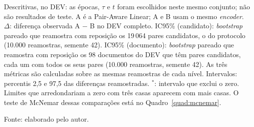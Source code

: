 \vspace{-\baselineskip}
\nopagebreak\noindent\begin{minipage}{\linewidth}
{\footnotesize Descritivas, no DEV: as épocas, $\tau$ e $t$ foram escolhidos neste mesmo conjunto; não são resultados de teste. A é a Pair-Aware Linear; A e B usam o mesmo \emph{encoder}. $\Delta$: diferença observada A $-$ B no DEV completo. IC95\% (candidato): \emph{bootstrap} pareado que reamostra com reposição os 19\,064 pares candidatos, o do protocolo (10.000 reamostras, semente 42). IC95\% (documento): \emph{bootstrap} pareado que reamostra com reposição os 98 documentos do DEV que têm pares candidatos, cada um com todos os seus pares (10.000 reamostras, semente 42). As três métricas são calculadas sobre as mesmas reamostras de cada nível. Intervalos: percentis 2,5 e 97,5 das diferenças reamostradas. $^{\ast}$: intervalo que exclui o zero. Limites que arredondariam a zero com três casas aparecem com mais casas. O teste de McNemar dessas comparações está no Quadro~\ref{quad:mcnemar}.\par}\vspace{4pt}
{\footnotesize Fonte: elaborado pelo autor.}
\end{minipage}\par
\endgroup
